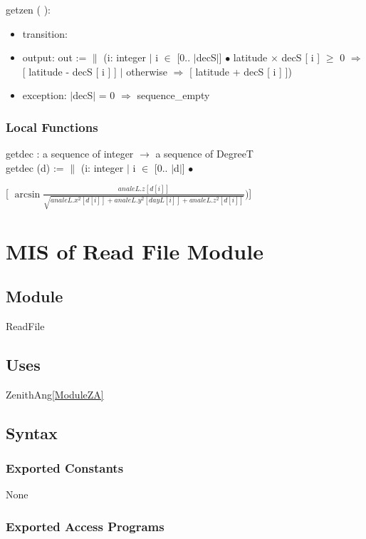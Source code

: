 \documentclass[12pt, titlepage]{article}
\begin{document}
\noindent  getzen ( ):
\begin{itemize}
\item transition:

\item output: out := $\|$ (i: integer $|$ i $\in$ [0.. $|$decS$|$] $\bullet$ latitude $\times$ decS [ i ] $\geq$ 0 $\Rightarrow$ [ latitude - decS [  i ] ] $|$ otherwise $\Rightarrow$ [ latitude + decS [ i ] ])
\item exception: $|$decS$|$ = 0 $\Rightarrow$ sequence\_empty
\end{itemize}


\subsubsection{Local Functions}
getdec : a sequence of integer $\rightarrow$ a sequence of DegreeT\\
getdec (d) := $\|$ (i: integer $|$ i $\in$ [0.. $|$d$|$] $\bullet$ 
\begin{center}\large
[ $\arcsin \frac{analeL.z [d[ i ] ]}{ \sqrt{analeL.x^2 [ d[ i ] ] + analeL.y^2 [ dayL[ i ] ] + analeL.z^2 [ d[ i ] ]}}) $]
\end{center}

\newpage

\section{MIS of Read File Module} \label{ModuleR} 

\subsection{Module}
ReadFile


\subsection{Uses}
ZenithAng\ref{ModuleZA}


\subsection{Syntax}

\subsubsection{Exported Constants}
None

\subsubsection{Exported Access Programs}
\end{document}
